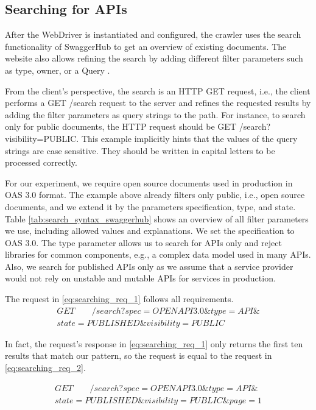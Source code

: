 \subsection{Searching for APIs}
After the WebDriver is instantiated and configured, the crawler uses the search functionality of SwaggerHub to get an overview of existing documents. The website also allows refining the search by adding different filter parameters such as type, owner, or a Query \cite{swaggerhub_doc_ui_searching}.

From the client's perspective, the search is an HTTP GET request, i.e., the client performs a GET /search request to the server and refines the requested results by adding the filter parameters as query strings to the path. For instance, to search only for public documents, the HTTP request should be GET /search?visibility=PUBLIC. This example implicitly hints that the values of the query strings are case sensitive. They should be written in capital letters to be processed correctly.

For our experiment, we require open source documents used in production in OAS 3.0 format.
The example above already filters only public, i.e., open source documents, and we extend it by the parameters specification, type, and state. Table \ref{tab:search_syntax_swaggerhub} shows an overview of all filter parameters we use, including allowed values and explanations.
We set the specification to OAS 3.0.
The type parameter allows us to search for APIs only and reject libraries for common components, e.g., a complex data model used in many APIs. Also, we search for published APIs only as we assume that a service provider would not rely on unstable and mutable APIs for services in production.
\clearpage
{}

The request in \ref{eq:searching_req_1} follows all requirements. 
\begin{multline}
\label{eq:searching_req_1}
    GET \qquad /search?spec=OPENAPI3.0\&type=API\&\\state=PUBLISHED\&visibility=PUBLIC
\end{multline}


In fact, the request's response in \ref{eq:searching_req_1} only returns the first ten results that match our pattern, so the request is equal to the request in \ref{eq:searching_req_2}. 

\begin{multline}
\label{eq:searching_req_2}
GET \qquad /search?spec=OPENAPI3.0\&type=API\&\\state=PUBLISHED\&visibility=PUBLIC\&page=1    
\end{multline}


